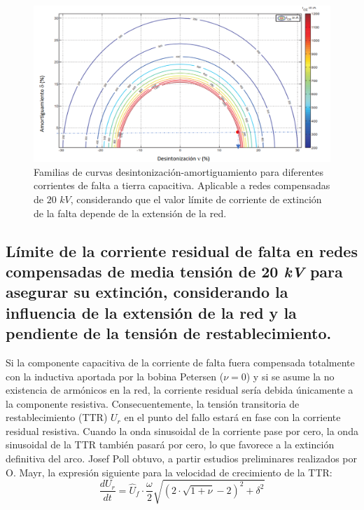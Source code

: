             \begin{figure}[H]
                \centering
                \includegraphics[scale=0.3]{capitulos/amortVSDesint3.png}
                \caption{Familias de curvas desintonización-amortiguamiento para diferentes corrientes de falta a tierra capacitiva. Aplicable a redes compensadas de $20\textit{ kV}$, considerando que el valor límite de corriente de extinción de la falta depende de la extensión de la red.}
                \label{fig:amortVSDesint3}
            \end{figure}

        \subsection{Límite de la corriente residual de falta en redes compensadas de media tensión de 20\textit{ kV} para asegurar su extinción, considerando la influencia de la extensión de la red y la pendiente de la tensión de restablecimiento.}
            Si la componente capacitiva de la corriente de falta fuera compensada totalmente con la inductiva aportada por la bobina Petersen ($\nu=0$) y si se asume la no existencia de armónicos en la red, la corriente residual sería debida únicamente a la componente resistiva. Consecuentemente, la tensión transitoria de restablecimiento (TTR) $U_\textit{r}$ en el punto del fallo estará en fase con la corriente residual resistiva. Cuando la onda sinusoidal de la corriente pase por cero, la onda sinusoidal de la TTR también pasará por cero, lo que favorece a la extinción definitiva del arco. Josef Poll obtuvo, a partir estudios preliminares realizados por O. Mayr, la expresión siguiente para la velocidad de crecimiento de la TTR:
            \begin{equation}\label{eq:TTR}
                \dfrac{dU_\textit{r}}{dt} = \hat U_\textit{f} \cdot \dfrac{\omega}{2}\sqrt{(2\cdot \sqrt{1+\nu}-2)^2+\delta^2}
            \end{equation}

